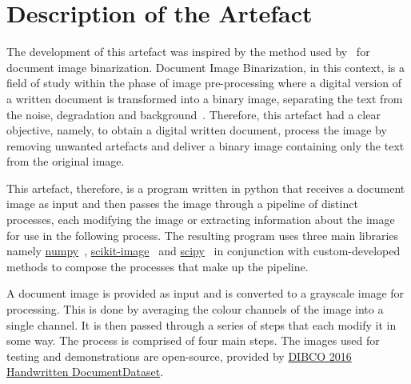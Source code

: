 \documentclass[a4paper, 12pt]{report}
\begin{document}
\chapter{Description of the Artefact}
The development of this artefact was inspired by the method used by~\cite{su2012robust} for document image binarization. Document Image Binarization, in this context, is a field of study within the phase of image pre-processing where a digital version of a written document is transformed into a binary image, separating the text from the noise, degradation and background~\cite{su2012robust}. Therefore, this artefact had a clear objective, namely, to obtain a digital written document, process the image by removing unwanted artefacts and deliver a binary image containing only the text from the original image.\par

This artefact, therefore, is a program written in python that receives a document image as input and then passes the image through a pipeline of distinct processes, each modifying the image or extracting information about the image for use in the following process. The resulting program uses three main libraries namely \href{https://numpy.org/}{numpy}~\cite{numpy}, \href{https://scikit-image.org/}{scikit-image}~\cite{scikit-image} and \href{https://scikit-image.org/}{scipy}~\cite{2020SciPy-NMeth} in conjunction with custom-developed methods to compose the processes that make up the pipeline. \par

A document image is provided as input and is converted to a grayscale image for processing. This is done by averaging the colour channels of the image into a single channel. It is then passed through a series of steps that each modify it in some way. The process is comprised of four main steps. The images used for testing and
demonstrations are open-source, provided by \href{https://vc.ee.duth.gr/h-dibco2016/}{DIBCO 2016 Handwritten DocumentDataset}.


\end{document}
